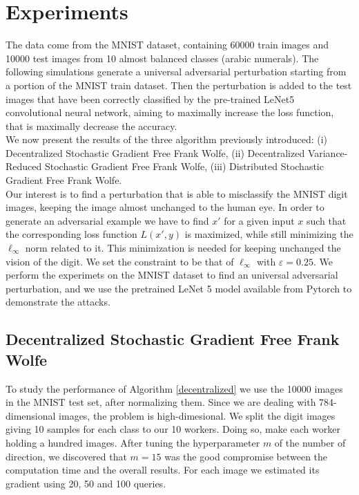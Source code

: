 \section{Experiments}
The data come from the MNIST dataset, containing 60000 train images and 10000 test images from 10 almost balanced classes (arabic numerals). The following simulations generate a universal adversarial perturbation starting from a portion of the MNIST train dataset. Then the perturbation is added to the test images that have been correctly classified by the pre-trained LeNet5 convolutional neural network, aiming to maximally increase the loss function, that is maximally decrease the accuracy.\\
We now present the results of the three algorithm previously introduced: (i) Decentralized Stochastic Gradient Free Frank Wolfe, (ii) Decentralized Variance-Reduced Stochastic Gradient Free Frank Wolfe, (iii) Distributed Stochastic Gradient Free Frank Wolfe.\\
Our interest is to find a perturbation that is able to misclassify the MNIST digit images, keeping the image almost unchanged to the human eye. In order to generate an adversarial example we have to find $x'$ for a given input $x$ such that the corresponding loss function $L(x',y)$ is maximized, while still minimizing the $\ell_{\infty}$ norm related to it. This minimization is needed for keeping unchanged the vision of the digit. We set the constraint to be that of $\ell_{\infty}$ with $\varepsilon=0.25$. We perform the experimets on the MNIST dataset to find an universal adversarial perturbation, and we use the pretrained LeNet 5 model available from Pytorch to demonstrate the attacks.

\subsection{Decentralized Stochastic Gradient Free Frank Wolfe}
To study the performance of Algorithm \ref{decentralized} we use the 10000 images in the MNIST test set, after normalizing them. Since we are dealing with 784-dimensional images, the problem is high-dimesional. We split the digit images giving 10 samples for each class to our 10 workers. Doing so, make each worker holding a hundred images. After tuning the hyperparameter $m$ of the number of direction, we discovered that $m=15$ was the good compromise between the computation time and the overall results. For each image we estimated its gradient using 20, 50 and 100 queries.

